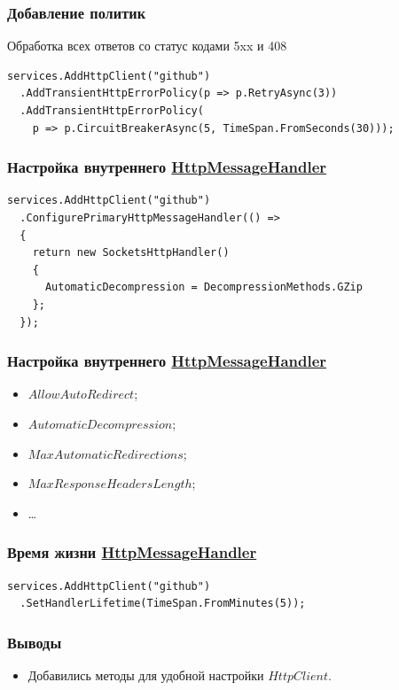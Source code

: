 \documentclass[17pt,aspectratio=169]{beamer}
\begin{document}
\begin{frame}[fragile]
\frametitle{Добавление политик}
Обработка всех ответов со статус кодами 5xx и 408
\newline
\begin{lstlisting}
services.AddHttpClient("github")
  .AddTransientHttpErrorPolicy(p => p.RetryAsync(3))
  .AddTransientHttpErrorPolicy(
    p => p.CircuitBreakerAsync(5, TimeSpan.FromSeconds(30)));
\end{lstlisting}
\end{frame}

\begin{frame}[fragile]
\frametitle{Настройка внутреннего \href{https://docs.microsoft.com/en-us/dotnet/api/system.net.http.socketshttphandler?view=netcore-2.2}{HttpMessageHandler}}
\begin{lstlisting}
services.AddHttpClient("github")
  .ConfigurePrimaryHttpMessageHandler(() =>
  {
    return new SocketsHttpHandler()
    {
      AutomaticDecompression = DecompressionMethods.GZip
    };
  });
\end{lstlisting}
\end{frame}

\begin{frame}[fragile]
\frametitle{Настройка внутреннего \href{https://docs.microsoft.com/en-us/dotnet/api/system.net.http.socketshttphandler?view=netcore-2.2}{HttpMessageHandler}}
\begin{itemize}
	\item $AllowAutoRedirect$;
	\item $AutomaticDecompression$;
	\item $MaxAutomaticRedirections$;
	\item $MaxResponseHeadersLength$;
	\item \ldots
\end{itemize}
\end{frame}

\begin{frame}[fragile]
\frametitle{Время жизни \href{https://docs.microsoft.com/en-us/dotnet/api/system.net.http.socketshttphandler?view=netcore-2.2}{HttpMessageHandler}}
\begin{lstlisting}
services.AddHttpClient("github")
  .SetHandlerLifetime(TimeSpan.FromMinutes(5));
\end{lstlisting}
\end{frame}

\begin{frame}
\frametitle{Выводы}
\begin{itemize}
	\item Добавились методы для удобной настройки $HttpClient$.
\end{itemize}
\end{frame}
\end{document}
